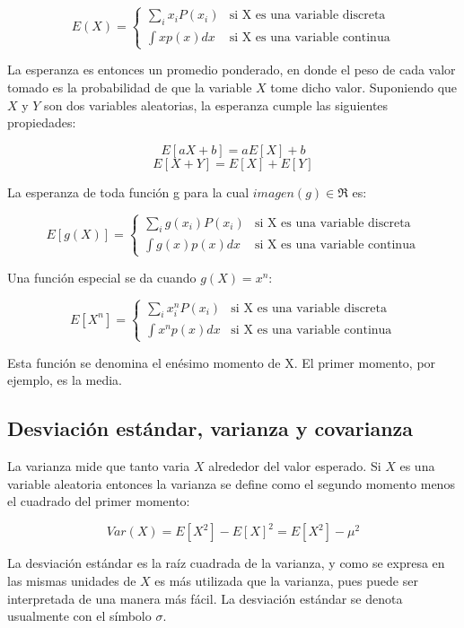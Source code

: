 \documentclass[a4paper, 11pt, oneside]{report}
\begin{document}
	\[ E(X) = \left\{ \begin{array}{ll}
		\sum_{i}{x_iP(x_i)}   & \mbox{si X es una variable discreta} \\
		\int {xp(x)dx} & \mbox{si X es una variable continua}
	\end{array} \right. \]

La esperanza es entonces un promedio ponderado, en donde el peso de cada valor tomado es la probabilidad de que la variable $X$ tome dicho valor. Suponiendo que $X$ y $Y$ son dos variables aleatorias, la esperanza cumple las siguientes propiedades:

	\[E[aX + b] = aE[X] + b\]
	\[E[X + Y] = E[X] + E[Y]\]

La esperanza de toda función g para la cual $imagen(g) \in \Re$ es:

	\[ E[g(X)] = \left\{ \begin{array}{ll}
		\sum_{i}{g(x_i)P(x_i)}   & \mbox{si X es una variable discreta} \\
		\int {g(x)p(x)dx} & \mbox{si X es una variable continua}
	\end{array} \right. \]

Una función especial se da cuando $g(X) = x^n$:

	\[ E[X^n] = \left\{ \begin{array}{ll}
		\sum_{i}{x_i^nP(x_i)}   & \mbox{si X es una variable discreta} \\
		\int {x^np(x)dx} & \mbox{si X es una variable continua}
	\end{array} \right. \]

Esta función se denomina el enésimo momento de X. El primer momento, por ejemplo, es la media.

\subsection{Desviación estándar, varianza y covarianza}

La varianza mide que tanto varia $X$ alrededor del valor esperado. Si $X$ es una variable aleatoria entonces la varianza se define como el segundo momento menos el cuadrado del primer momento:

	\[Var(X) = E[X^2] - E[X]^2 = E[X^2] - \mu^2\]

La desviación estándar es la raíz cuadrada de la varianza, y como se expresa en las mismas unidades de $X$ es más utilizada que la varianza, pues puede ser interpretada de una manera más fácil. La desviación estándar se denota usualmente con el símbolo $\sigma$.
\end{document}
